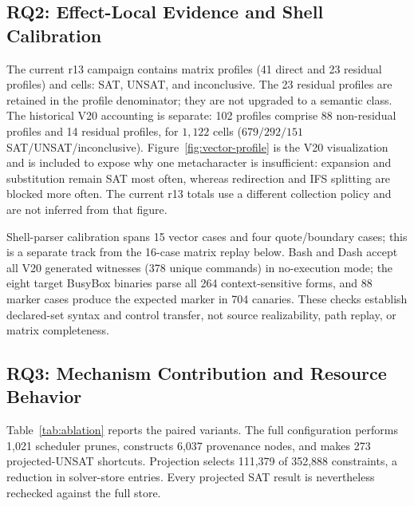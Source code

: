 \subsection{RQ2: Effect-Local Evidence and Shell Calibration}

The current r13 campaign contains \TSDSReviewCampaignProfiles{} matrix profiles
(41 direct and 23 residual profiles) and
\TSDSReviewCampaignCells{} cells:
\TSDSReviewCampaignVectorSatCells{} SAT,
\TSDSReviewCampaignMatrixUnsatCells{} UNSAT, and
\TSDSReviewCampaignInconclusiveCells{} inconclusive. The 23 residual profiles
are retained in the profile denominator; they are not upgraded to a semantic
class. The historical V20 accounting is separate: 102 profiles comprise 88
non-residual profiles and 14 residual profiles, for $1{,}122$ cells
($679/292/151$ SAT/UNSAT/inconclusive). Figure~\ref{fig:vector-profile} is the
V20 visualization and is included to expose why one metacharacter is
insufficient: expansion and substitution remain SAT most often, whereas
redirection and IFS splitting are blocked more often. The current r13 totals
use a different collection policy and are not inferred from that figure.

Shell-parser calibration spans 15 vector cases and four quote/boundary cases;
this is a separate track from the 16-case matrix replay below. Bash and Dash
accept all \TSDSSatDecisions{} V20 generated witnesses (378 unique commands) in
no-execution mode; the eight target BusyBox binaries parse all 264
context-sensitive forms, and 88 marker cases produce the expected marker in 704
canaries. These checks establish declared-set syntax and control transfer, not
source realizability, path replay, or matrix completeness.

\subsection{RQ3: Mechanism Contribution and Resource Behavior}

Table~\ref{tab:ablation} reports the paired variants. The full configuration
performs 1,021 scheduler prunes, constructs 6,037 provenance nodes, and makes
273 projected-UNSAT shortcuts. Projection selects
111,379 of 352,888 constraints, a \TSDSProjectionReduction{} reduction in
solver-store entries. Every projected SAT result is nevertheless rechecked
against the full store.

